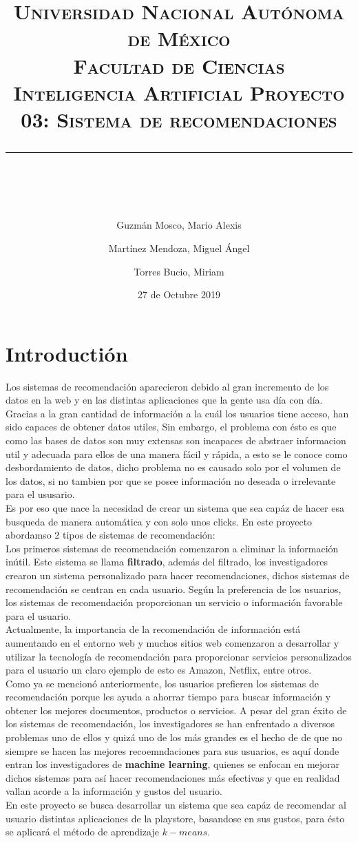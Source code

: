 \documentclass[10pt, a4paper]{article}
\title{\begin{center}
 {\LARGE \scshape Universidad Nacional Aut\'onoma de M\'exico \\ Facultad de Ciencias \\ Inteligencia Artificial Proyecto 03: Sistema de recomendaciones }
  \rule{1\textwidth}{2.0pt}\\
\end{center}}
\author{
  Guzmán Mosco, Mario Alexis\\
  \and  
  Mart\'inez Mendoza, Miguel \'Angel\\
  \and
  Torres Bucio, Miriam\\
}
\date{27 de Octubre 2019}
\begin{document}
\maketitle

\section{Introducti\'on}
Los sistemas de recomendaci\'on aparecieron debido al gran incremento de los datos en la web y en las distintas aplicaciones que la gente usa d\'ia con d\'ia. Gracias a la gran cantidad de informaci\'on a la cu\'al los usuarios tiene acceso, han sido capaces de obtener datos utiles, Sin embargo, el problema con \'esto es que como las bases de datos son muy extensas son incapaces de abstraer informacion util y adecuada para ellos de una manera f\'acil y r\'apida, a esto se le conoce como desbordamiento de datos, dicho problema no es causado solo por el volumen de los datos, si no tambien por que se posee informaci\'on no deseada o irrelevante para el ususario.\\
Es por eso que nace la necesidad de crear un sistema que sea cap\'az de hacer esa busqueda de manera autom\'atica y con solo unos clicks.
En este proyecto abordamso 2 tipos de sistemas de recomendaci\'on: \\
Los primeros sistemas de recomendación comenzaron a eliminar la información inútil. Este sistema se llama \textbf{filtrado}, además del filtrado, los investigadores crearon un sistema personalizado para hacer recomendaciones, dichos sistemas de recomendación se centran en cada usuario. Según la preferencia de los usuarios, los sistemas de recomendación proporcionan un servicio o información favorable para el usuario.\\ Actualmente, la importancia de la recomendación de información está aumentando en el entorno web y muchos sitios web comenzaron a desarrollar y utilizar la tecnología de recomendación para proporcionar servicios personalizados para el usuario un claro ejemplo de esto es Amazon, Netflix, entre otros.\\
Como ya se mencion\'o anteriormente, los usuarios prefieren los sistemas de recomendación porque les ayuda a ahorrar tiempo para buscar información y obtener los mejores documentos, productos o servicios. A pesar del gran \'exito de los sistemas de recomendaci\'on, los investigadores se han enfrentado a diversos problemas uno de ellos y quiz\'a uno de los m\'as grandes es el hecho de de que no siempre se hacen las mejores recoemndaciones para sus usuarios, es aqu\'i donde entran los investigadores de \textbf{machine learning}, quienes se enfocan en mejorar dichos sistemas para as\'i hacer recomendaciones m\'as efectivas y que en realidad vallan acorde a la informaci\'on y gustos del usuario.\\  
En este proyecto se busca desarrollar un sistema que sea cap\'az de recomendar al usuario distintas aplicaciones de la playstore, basandose en sus gustos, para \'esto se aplicar\'a el m\'etodo de aprendizaje $k-means$.
\end{document}
